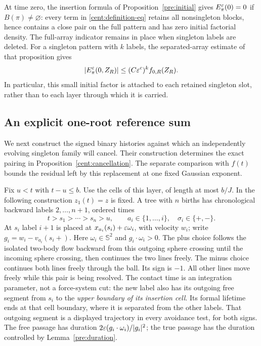 At time zero, the insertion formula of Proposition~\ref{pre:initial}
gives $E_\pi^\varepsilon(0)=0$ if $B(\pi)\ne\varnothing$: every term in
\eqref{cent:definition-eq} retains all nonsingleton blocks, hence
contains a close pair on the full pattern and has zero initial
factorial density. The full-array indicator remains in place when
singleton labels are deleted. For a singleton pattern with $k$ labels,
the separated-array estimate of that proposition gives
\begin{equation}\label{cent:initial-use}
 |E_\pi^\varepsilon(0,Z_R)|\leq(C\varepsilon^c)^k f_{0,R}(Z_R).
\end{equation}
In particular, this small initial factor is attached to each retained
singleton slot, rather than to each layer through which it is carried.

\subsection{An explicit one-root reference sum}

We next construct the signed binary histories against which an
independently evolving singleton family will cancel. Their construction
determines the exact pairing in Proposition~\ref{cent:cancellation}.
The separate comparison with $f(t)$ bounds the residual left by this
replacement at one fixed Gaussian exponent.

Fix $u<t$ with $t-u\leq b$. Use the cells of this layer, of length at
most $b/J$. In the following construction $z_1(t)=z$ is fixed. A tree
with $n$ births has chronological backward labels $2,\ldots,n+1$,
ordered times
\[
 t>s_1>\cdots>s_n>u,
 \qquad a_i\in\{1,\ldots,i\},\quad \sigma_i\in\{+,-\}.
\]
At $s_i$ label $i+1$ is placed at
$x_{a_i}(s_i)+\varepsilon\omega_i$, with velocity $w_i$; write
$g_i=w_i-v_{a_i}(s_i+)$. Here $\omega_i\in\mathbb S^2$ and
$g_i\cdot\omega_i>0$. The plus choice follows the isolated two-body
flow backward from this outgoing sphere crossing until the incoming
sphere crossing, then continues the two lines freely. The minus choice
continues both lines freely through the ball. Its sign is $-1$.
All other lines move freely while this pair is being resolved.
The contact time is an integration parameter, not a force-system cut:
the new label also has its outgoing free segment from $s_i$ to the
\emph{upper boundary of its insertion cell}. Its formal lifetime ends
at that cell boundary, where it is separated from the other labels.
That outgoing segment is a displayed trajectory in every avoidance
test, for both signs. The free passage has duration
$2\varepsilon(g_i\cdot\omega_i)/|g_i|^2$; the true passage has the duration
controlled by Lemma~\ref{pre:duration}.

